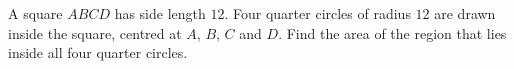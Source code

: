 A square $ABCD$ has side length $12$. Four quarter circles of radius $12$ are drawn inside the square, centred at $A$, $B$, $C$ and $D$. Find the area of the region that lies inside all four quarter circles.
